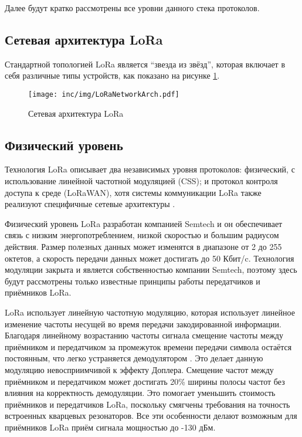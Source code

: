 Далее будут кратко рассмотрены все уровни данного стека протоколов.

\subsection{Сетевая архитектура LoRa}

Стандартной топологией LoRa является ``звезда из звёзд'', которая включает в себя различные типы устройств, как показано на рисунке \ref{fig:loranetworkarch}.

\begin{figure}[ht]
  \centering
  \texttt{[image: inc/img/LoRaNetworkArch.pdf]}
  \caption{Сетевая архитектура LoRa}
  \label{fig:loranetworkarch}
\end{figure}

\subsection{Физический уровень}

Технология LoRa описывает два независимых уровня протоколов: физический, с использование линейной частотной модуляцией (CSS); и протокол контроля доступа к среде (LoRaWAN), хотя системы коммуникации LoRa также реализуют специфичные сетевые архитектуры \cite{augustin2016}.

Физический уровень LoRa разработан компанией Semtech и он обеспечивает связь с низким энергопотреблением, низкой скоростью и большим радиусом действия.
Размер полезных данных может изменятся в диапазоне от 2 до 255 октетов, а скорость передачи данных может достигать до 50 Кбит/c. 
Технология модуляции закрыта и является собственностью компании Semtech, поэтому здесь будут рассмотрены только известные принципы работы передатчиков и приёмников LoRa.

LoRa использует линейную частотную модуляцию, которая использует линейное изменение частоты несущей во время передачи закодированной информации.
Благодаря линейному возрастанию частоты сигнала смещение частоты между приёмником и передатчиком за промежуток времени передачи символа остаётся постоянным, что легко устраняется демодулятором \cite{augustin2016}. 
Это делает данную модуляцию невосприимчивой к эффекту Доплера.
Смещение частот между приёмником и передатчиком может достигать 20\% ширины полосы частот без влияния на корректность демодуляции.
Это помогает уменьшить стоимость приёмников и передатчиков LoRa, поскольку смягчены требования на точность встроенных кварцевых резонаторов.
Все эти особенности делают возможным для приёмников LoRa приём сигнала мощностью 
до -130 дБм.

